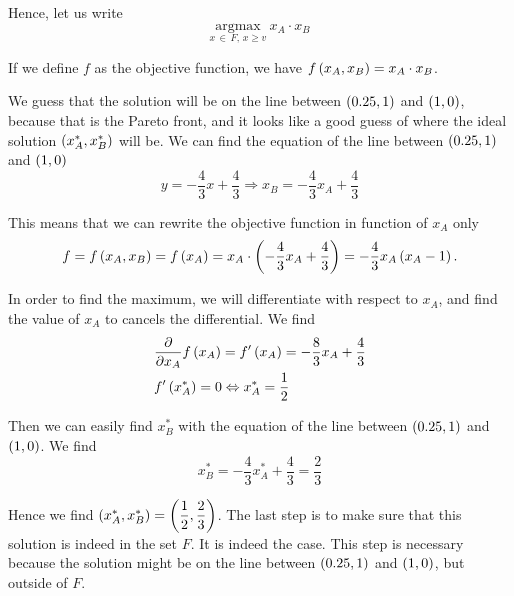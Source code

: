 \begin{enumerate} [label=\alph*.]
	Hence, let us write
	\begin{equation*}
	    \underset{x \, \in \, F, \, x \geq v}{\mathrm{argmax}} \ x_{A} \cdot x_{B}
	\end{equation*}
	
	If we define $f$ as the objective function, we have $f \left(x_{A}, x_{B}\right) = x_{A} \cdot x_{B}$.
	
	We guess that the solution will be on the line between $\left(0.25,1\right)$ and $\left(1,0\right)$, because that is the Pareto front, and it looks like a good guess of where the ideal solution $\left(x^{*}_{A}, x^{*}_{B}\right)$ will be. We can find the equation of the line between $\left(0.25,1\right)$ and $\left(1,0\right)$
    \begin{equation*}
        y = - \dfrac{4}{3} x + \dfrac{4}{3}
        \Rightarrow x_{B} = - \dfrac{4}{3} x_{A} + \dfrac{4}{3}
    \end{equation*}
    
    This means that we can rewrite the objective function in function of $x_{A}$ only
    \begin{equation*}
        f = f \left(x_{A}, x_{B}\right) = f \left(x_{A}\right) = x_{A} \cdot \left(- \dfrac{4}{3} x_{A} + \dfrac{4}{3}\right) = - \dfrac{4}{3} x_{A} \left(x_{A} - 1\right).
    \end{equation*}
    
    In order to find the maximum, we will differentiate with respect to $x_{A}$, and find the value of $x_{A}$ to cancels the differential. We find
    \begin{align*}
        & \dfrac{\partial}{\partial x_{A}} f \left(x_{A}\right) = f' \left(x_{A}\right) = - \dfrac{8}{3} x_{A} + \dfrac{4}{3} \\
        & f' \left(x^{*}_{A}\right) = 0 \Leftrightarrow x^{*}_{A} = \dfrac{1}{2}
    \end{align*}
    
    Then we can easily find $x^{*}_{B}$ with the equation of the line between $\left(0.25,1\right)$ and $\left(1,0\right)$. We find
    \begin{equation*}
        x^{*}_{B} = - \dfrac{4}{3} x^{*}_{A} + \dfrac{4}{3} = \dfrac{2}{3}
    \end{equation*}
    
    Hence we find $\left(x^{*}_{A}, x^{*}_{B}\right) = \left(\dfrac{1}{2}, \dfrac{2}{3}\right)$. The last step is to make sure that this solution is indeed in the set $F$. It is indeed the case. This step is necessary because the solution might be on the line between $\left(0.25,1\right)$ and $\left(1,0\right)$, but outside of $F$.
    

\end{enumerate}
